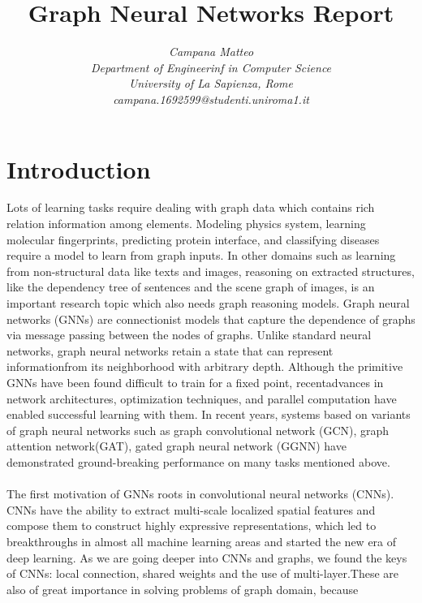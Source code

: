\documentclass[12pt,a4paper]{article}
\author{\textit{Campana Matteo} \\
\textit{Department of Engineerinf in Computer Science}\\
\textit{University of La Sapienza, Rome} \\
\textit{campana.1692599@studenti.uniroma1.it}}
\date{}
\title{Graph Neural Networks Report}
\begin{document}
\maketitle
{}

\section*{Introduction}


Lots of learning tasks require dealing with graph data which contains rich relation information among elements. Modeling physics system, learning molecular fingerprints, predicting protein interface, and classifying diseases require a model to learn from graph inputs. In other domains such as learning from non-structural data like texts and images, reasoning on extracted structures, like the dependency tree of sentences and the scene graph of images, is an important research topic which also needs graph reasoning models. Graph neural networks (GNNs) are connectionist models that capture the dependence of graphs via message passing between the nodes of graphs. Unlike standard neural networks, graph neural networks retain a state that can represent informationfrom its neighborhood with arbitrary depth. Although the primitive GNNs have been found difficult to train for a fixed point, recentadvances in network architectures, optimization techniques, and parallel computation have enabled successful learning with them. In recent years, systems based on variants of graph neural networks such as graph convolutional network (GCN), graph attention network(GAT), gated graph neural network (GGNN) have demonstrated ground-breaking performance on many tasks mentioned above. 
\\ \\
The first motivation of GNNs roots in convolutional neural networks (CNNs). CNNs  have the ability to extract multi-scale localized spatial features and compose them to construct highly expressive representations, which led to breakthroughs in almost  all machine learning areas and started the new era of deep learning. As we are going deeper into CNNs and graphs, we found the keys of CNNs: local  connection, shared weights and the use of multi-layer.These are also of great importance in solving problems of graph domain, because 
\end{document}
